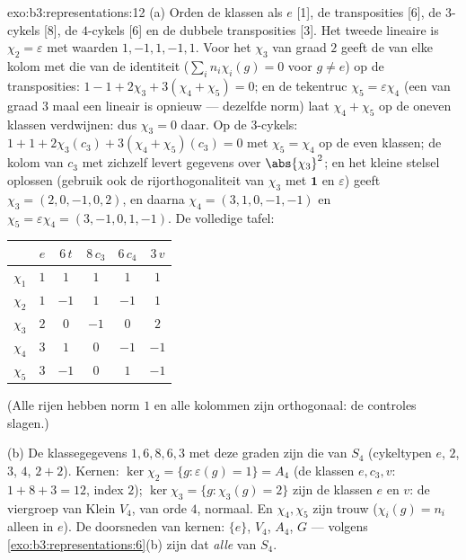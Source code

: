 \begin{solution}{exo:b3:representations:12}
(a) Orden de klassen als $e$ [1], de transposities [6], de
$3$-cykels [8], de $4$-cykels [6] en de dubbele transposities [3].
Het tweede lineaire  is $\chi_2 = \varepsilon$ met
waarden $1, -1, 1, -1, 1$. Voor het  $\chi_3$ van graad
$2$ geeft de  van elke kolom met die van de
identiteit ($\sum_in_i\chi_i(g) = 0$ voor $g \neq e$) op de
transposities: $1 - 1 + 2\chi_3 + 3(\chi_4 + \chi_5) = 0$; en de
tekentruc $\chi_5 = \varepsilon\chi_4$ (een  van graad $3$
maal een lineair  is opnieuw  --- dezelfde
norm) laat $\chi_4 + \chi_5$ op de oneven klassen verdwijnen: dus
$\chi_3 = 0$ daar. Op de $3$-cykels: $1 + 1 + 2\chi_3(c_3) +
3(\chi_4 + \chi_5)(c_3) = 0$ met $\chi_5 = \chi_4$ op de even
klassen; de kolom van $c_3$ met zichzelf levert gegevens over
$\abs{\chi_3}^2$; en het kleine stelsel oplossen (gebruik ook de
rijorthogonaliteit van $\chi_3$ met $\mathbf 1$ en $\varepsilon$)
geeft $\chi_3 = (2, 0, -1, 0, 2)$, en daarna $\chi_4 = (3, 1, 0,
-1, -1)$ en $\chi_5 = \varepsilon\chi_4 = (3, -1, 0, 1, -1)$. De
volledige tafel:
\begin{center}
\begin{tabular}{c|ccccc}
 & $e$ & $6\,t$ & $8\,c_3$ & $6\,c_4$ & $3\,v$\\
\hline
$\chi_1$ & $1$ & $1$ & $1$ & $1$ & $1$\\
$\chi_2$ & $1$ & $-1$ & $1$ & $-1$ & $1$\\
$\chi_3$ & $2$ & $0$ & $-1$ & $0$ & $2$\\
$\chi_4$ & $3$ & $1$ & $0$ & $-1$ & $-1$\\
$\chi_5$ & $3$ & $-1$ & $0$ & $1$ & $-1$\\
\end{tabular}
\end{center}
(Alle rijen hebben norm $1$ en alle kolommen zijn orthogonaal: de
controles slagen.)

(b) De klassegegevens $1, 6, 8, 6, 3$ met deze graden zijn die van
$S_4$ (cykeltypen $e$, $2$, $3$, $4$, $2{+}2$). Kernen:
$\ker\chi_2 = \{g : \varepsilon(g) = 1\} = A_4$ (de klassen $e,
c_3, v$: $1 + 8 + 3 = 12$, index $2$); $\ker\chi_3 = \{g :
\chi_3(g) = 2\}$ zijn de klassen $e$ en $v$: de viergroep van
Klein $V_4$, van orde $4$, normaal. En $\chi_4, \chi_5$ zijn trouw
($\chi_i(g) = n_i$ alleen in $e$). De doorsneden van kernen:
$\{e\}$, $V_4$, $A_4$, $G$ --- volgens
\cref{exo:b3:representations:6}(b) zijn dat \emph{alle}
 van $S_4$.


\end{solution}
